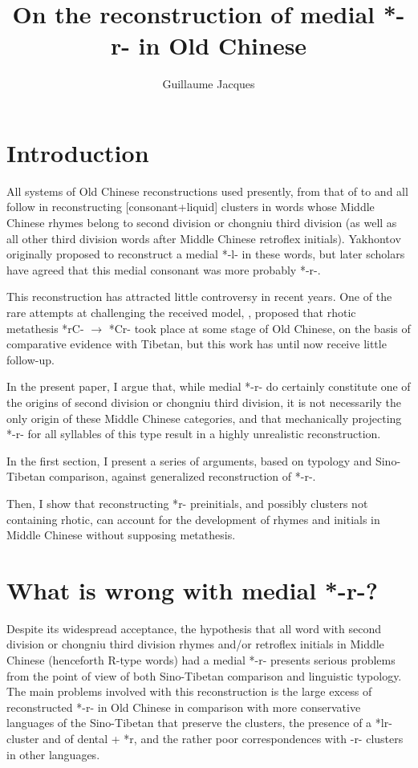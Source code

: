 \documentclass[oldfontcommands,oneside,a4paper,11pt]{article}
\newcommand{\ipa}[1]{{\phon \mbox{#1}}} %
\newcommand{\change}[2]{*\ipa{#1} $\rightarrow$ \ipa{#2}}
\begin{document}
 
\title{On the reconstruction of medial *-r- in Old Chinese}
\author{Guillaume Jacques}
\maketitle
 

\section{Introduction}
All systems of Old Chinese reconstructions used  presently, from that of \citealt{li71oc} to \citet{schuessler09minimal} and \citet{bs14oc} all follow \citet{yakhontov61sochetaniya} in reconstructing [consonant+liquid] clusters in words whose Middle Chinese rhymes belong to second division or chongniu third division (as well as all other third division words after Middle Chinese retroflex initials). Yakhontov originally proposed to reconstruct a medial *\ipa{-l-} in these words, but later scholars have agreed that this medial consonant was more probably *\ipa{-r-}.

This reconstruction has attracted little controversy in recent years. One of the rare attempts at challenging the received model,  \citet{handel02r}, proposed that rhotic metathesis \change{rC-}{*Cr-}  took place at some stage of Old Chinese, on the basis of comparative evidence with Tibetan, but this work has until now receive little follow-up.

In the present paper, I argue that, while medial *\ipa{-r-} do certainly constitute one of the origins of  second division or chongniu third division, it is not necessarily the only origin of these Middle Chinese categories, and that mechanically projecting *\ipa{-r-} for all syllables of this type result in a highly unrealistic reconstruction.

In the first section, I present a series of arguments, based on typology and Sino-Tibetan comparison, against generalized reconstruction of *\ipa{-r-}.

Then, I show that reconstructing *\ipa{r-} preinitials, and possibly clusters not containing rhotic, can account for the development of rhymes and initials in Middle Chinese without supposing metathesis.

\section{What is wrong with medial *\ipa{-r-}?} \label{sec:medial}
Despite its widespread acceptance, the hypothesis that all word with second division or chongniu third division rhymes and/or retroflex initials in Middle Chinese (henceforth R-type words) had a medial *\ipa{-r-} presents serious problems from the point of view of both Sino-Tibetan comparison and linguistic typology. The main problems involved with this reconstruction is the large excess of reconstructed *\ipa{-r-} in Old Chinese in comparison with more conservative languages of the Sino-Tibetan that preserve the clusters, the presence of a *\ipa{lr-} cluster and of dental + *\ipa{r}, and the rather poor correspondences with \ipa{-r-} clusters in other languages.
\end{document}
